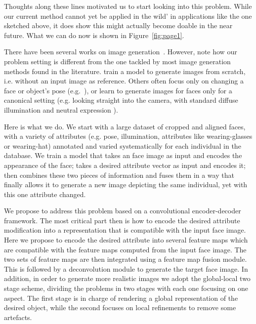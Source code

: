 \documentclass[10pt,twocolumn,letterpaper]{article}
\begin{document}
Thoughts along these lines motivated us to start looking into this problem.
While our current method cannot yet be applied in the wild’ in applications like the one sketched above, it does show this might actually become doable in the near future.
What we can do now is shown in Figure~\ref{fig:page1}.

There have been several works on image generation~\cite{Dosovitskiy-cvpr15, Denton-nips15, Gauthier-14, Goodfellow-nips14, Hinton-icann11, Kingma-iclr14, Kulkarni-nips15, Li-icml15, Rezende-icml14, Tieleman-Thesis, Yang-nips15, Yim-cvpr15, zhu2013deep, zhu-nips14}.
However, note how our problem setting is different from the one tackled by most image generation methods found in the literature.
\cite{Denton-nips15, Gauthier-14, Goodfellow-nips14, Li-icml15} train a model to generate images from scratch, i.e. without an input image as reference.
Others often focus only on changing a face or object’s pose (e.g.~\cite{Dosovitskiy-cvpr15,Yang-nips15}), or learn to generate images for faces only for a canonical setting (e.g. looking straight into the camera, with standard diffuse illumination and neutral expression \cite{Yim-cvpr15,zhu2013deep}).

Here is what we do.
We start with a large dataset of cropped and aligned faces, with a variety of attributes (e.g. pose, illumination, attributes like wearing-glasses or wearing-hat) annotated and varied systematically for each individual in the database.
We train a model that takes an face image as input and encodes the appearance of the face; takes a desired attribute vector as input and encodes it; then combines these two pieces of information and fuses them in a way that finally allows it to generate a new image depicting the same individual, yet with this one attribute changed.

We propose to address this problem based on a convolutional encoder-decoder framework.
The most critical part then is how to encode the desired attribute modification into a representation that is compatible with the input face image.
Here we propose to encode the desired attribute into several feature maps which are compatible with the feature maps computed from the input face image.
The two sets of feature maps are then integrated using a feature map fusion module.
This is followed by a deconvolution module to generate the target face image.
In addition, in order to generate more realistic images we adopt the global-local two stage scheme, dividing the problems in two stages with each one focusing on one aspect. The first stage is in charge of rendering a global representation of the desired object, while the second focuses on local refinements to remove some artefacts.
\end{document}
